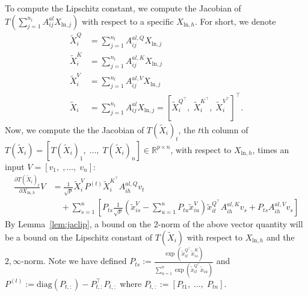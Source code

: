 \documentclass{article}
\begin{document}
To compute the Lipschitz constant, we compute the Jacobian of $T(\sum_{j=1}^{n_l} A^{al}_{ij}X_{\text{ln}, j})$ with respect
to a specific $X_{\text{ln}, h}$. For short, we denote 
\begin{align*}
\tilde X_i^Q &= \sum_{j=1}^{n_l} A^{al, Q}_{ij} X_{\text{ln},j}\\
\tilde X_i^K &= \sum_{j=1}^{n_l} A^{al, K}_{ij} X_{\text{ln},j}\\
\tilde X_i^V &= \sum_{j=1}^{n_l} A^{al, V}_{ij} X_{\text{ln},j}\\
\tilde X_i &= \sum_{j=1}^{n_l} A^{al}_{ij} X_{\text{ln},j} = 
[\tilde X_i^{Q^\top},\; \tilde X_i^{K^\top},\; \tilde X_i^{V^\top}]^\top.
\end{align*}
Now, we compute the the Jacobian of $T(\tilde X_i)_t$, 
the $t$th column of $T(\tilde X_i) = [T(\tilde X_i)_1,\; \ldots,\; T(\tilde X_i)_n]\in\mathbb R^{p\times n}$,
with respect to $X_{\text{ln}, h}$, times an input $V = [v_1,\;,\ldots,\; v_n]$:
\begin{align}
  \frac{\partial T(\tilde X_i)_t}{\partial X_{\text{ln}, h}}V
  & = \frac1{\sqrt p}\tilde X_i^V P^{(t)} \tilde X_i^{K^\top} A_{ih}^{al, Q} v_t \label{eq:lna} \\
  &\quad + \sum_{s=1}^n [P_{ts}\frac1{\sqrt p} (\tilde x^V_{is} - \sum_{u=1}^n P_{tu} \tilde x^V_{iu}) \tilde x_{it}^{Q^\top}
  A^{al, K}_{ih} v_s + P_{ts} A^{al, V}_{ih} v_s]\nonumber
\end{align}
By Lemma~\ref{lem:jaclip}, a bound on the 2-norm of the above vector quantity will be a bound on the Lipschitz constant 
of $T(\tilde X_i)$ with respect to $X_{\text{ln}, h}$ and the $2,\infty$-norm.
Note we have defined $P_{ts} := \frac{\exp(\tilde x_{it}^{Q^\top} \tilde x_{is}^K)}{
\sum_{u=1}^n \exp(\tilde x_{it}^{Q^\top}\tilde x_{iu})}$ and $P^{(t)} := \mathrm{diag}(P_{t,:}) - P_{t,:}^\top P_{t,:}$ where 
$P_{t,:} := [P_{t1},\;\ldots,\; P_{tn}]$.
\end{document}
